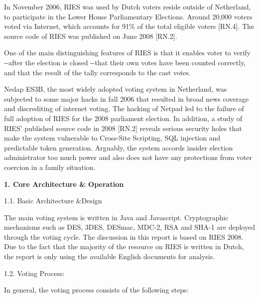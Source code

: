 In November 2006, RIES was used by Dutch voters reside outside of Netherland, to participate in the Lower House Parliamentary Elections. Around 20,000 voters voted via Internet, which accounts for 91\% of the total eligible voters [RN.4]. The source code of RIES was published on June 2008 [RN.2].

One of the main distinguishing features of RIES is that it enables voter to verify -{}-after the election is closed -{}-that their own votes have been counted correctly, and that the result of the tally corresponds to the cast votes.

Nedap ES3B, the most widely adopted voting system in Netherland, was subjected to some major hacks in fall 2006 that resulted in broad news coverage and discrediting of internet voting. The hacking of Netpad led to the failure of full adoption of RIES for the 2008 parliament election. In addition, a study of RIES' published source code in 2008 [RN.2] reveals serious security holes that make the system vulnerable to Cross-Site Scripting, SQL injection and predictable token generation. Arguably, the system accords insider election administrator too much power and also does not have any protections from voter coercion in a family situation.

\textbf{1. Core Architecture \& Operation}

1.1. Basic Architecture \&Design

The main voting system is written in Java and Javascript. Cryptographic mechanisms such as DES, 3DES, DESmac, MDC-2, RSA and SHA-1 are deployed through the voting cycle. The discussion in this report is based on RIES 2008. Due to the fact that the majority of the resource on RIES is written in Dutch, the report is only using the available English documents for analysis.

1.2. Voting Process:

In general, the voting process consists of the following steps:

